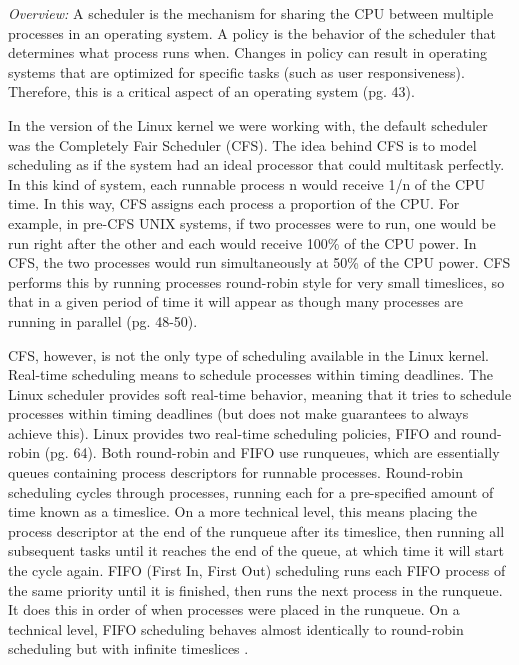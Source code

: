 \documentclass[letterpaper,10pt,titlepage]{article}
\newcommand{\tab}{\hspace*{2em}} %
\begin{document}
\tab \emph{Overview:} A scheduler is the mechanism for sharing the CPU between multiple processes in an operating system. A policy is the behavior of the scheduler that determines what process runs when. Changes in policy can result in operating systems that are optimized for specific tasks (such as user responsiveness). Therefore, this is a critical aspect of an operating system \cite{Love}(pg. 43). 

\tab In the version of the Linux kernel we were working with, the default scheduler was the Completely Fair Scheduler (CFS). The idea behind CFS is to model scheduling as if the system had an ideal processor that could multitask perfectly. In this kind of system, each runnable process n would receive 1/n of the CPU time. In this way, CFS assigns each process a proportion of the CPU. For example, in pre-CFS UNIX systems, if two processes were to run, one would be run right after the other and each would receive 100\% of the CPU power. In CFS, the two processes would run simultaneously at 50\% of the CPU power. CFS performs this by running processes round-robin style for very small timeslices, so that in a given period of time it will appear as though many processes are running in parallel \cite{Love}(pg. 48-50).

\tab CFS, however, is not the only type of scheduling available in the Linux kernel. Real-time scheduling means to schedule processes within timing deadlines. The Linux scheduler provides soft real-time behavior, meaning that it tries to schedule processes within timing deadlines (but does not make guarantees to always achieve this). Linux provides two real-time scheduling policies, FIFO and round-robin \cite{Love}(pg. 64). Both round-robin and FIFO use runqueues, which are essentially queues containing process descriptors for runnable processes. Round-robin scheduling cycles through processes, running each for a pre-specified amount of time known as a timeslice. On a more technical level, this means placing the process descriptor at the end of the runqueue after its timeslice, then running all subsequent tasks until it reaches the end of the queue, at which time it will start the cycle again. FIFO (First In, First Out) scheduling runs each FIFO process of the same priority until it is finished, then runs the next process in the runqueue. It does this in order of when processes were placed in the runqueue. On a technical level, FIFO scheduling behaves almost identically to round-robin scheduling but with infinite timeslices \cite{Bovet}.
\end{document}

